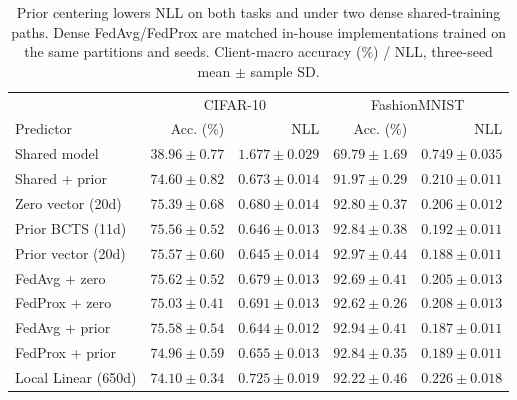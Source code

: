 \begin{table}[!htb]
\centering\small
\setlength{\tabcolsep}{5pt}
\caption{Prior centering lowers NLL on both tasks and under two dense shared-training paths. Dense FedAvg/FedProx are matched in-house implementations trained on the same partitions and seeds. Client-macro accuracy (\%) / NLL, three-seed mean $\pm$ sample SD.}\label{tab:main}
\begin{tabular}{lrrrr}\toprule
& \multicolumn{2}{c}{CIFAR-10} & \multicolumn{2}{c}{FashionMNIST}\\
Predictor & Acc. (\%) & NLL & Acc. (\%) & NLL\\\midrule
Shared model & $38.96\pm0.77$ & $1.677\pm0.029$ & $69.79\pm1.69$ & $0.749\pm0.035$\\
Shared + prior & $74.60\pm0.82$ & $0.673\pm0.014$ & $91.97\pm0.29$ & $0.210\pm0.011$\\
Zero vector (20d) & $75.39\pm0.68$ & $0.680\pm0.014$ & $92.80\pm0.37$ & $0.206\pm0.012$\\
Prior BCTS (11d) & $75.56\pm0.52$ & $0.646\pm0.013$ & $92.84\pm0.38$ & $0.192\pm0.011$\\
Prior vector (20d) & $75.57\pm0.60$ & $0.645\pm0.014$ & $92.97\pm0.44$ & $0.188\pm0.011$\\
FedAvg + zero & $75.62\pm0.52$ & $0.679\pm0.013$ & $92.69\pm0.41$ & $0.205\pm0.013$\\
FedProx + zero & $75.03\pm0.41$ & $0.691\pm0.013$ & $92.62\pm0.26$ & $0.208\pm0.013$\\
FedAvg + prior & $75.58\pm0.54$ & $0.644\pm0.012$ & $92.94\pm0.41$ & $0.187\pm0.011$\\
FedProx + prior & $74.96\pm0.59$ & $0.655\pm0.013$ & $92.84\pm0.35$ & $0.189\pm0.011$\\
Local Linear (650d) & $74.10\pm0.34$ & $0.725\pm0.019$ & $92.22\pm0.46$ & $0.226\pm0.018$\\
\bottomrule
\end{tabular}
\end{table}
